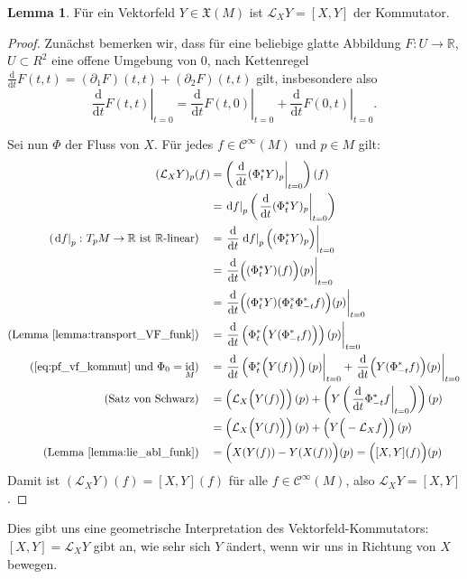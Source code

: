 \documentclass[a4paper]{scrreprt}
\numberwithin{equation}{chapter}
\newcommand{\D}{\mathrm{d}}
\DeclareMathOperator{\id}{id}
\newcommand{\sC}{\mathcal{C}^{\infty}}
\theoremstyle{definition}
\newtheorem{lemma}[defn]{Lemma}
\begin{document}
\begin{lemma}
	Für ein Vektorfeld $Y \in \mathfrak X(M)$ ist $\mathcal L_X Y = [X,Y]$ der Kommutator.

	\begin{proof}
		Zunächst bemerken wir, dass für eine beliebige glatte Abbildung $F \colon U \to \mathbb R$, $U \subset R^2$ eine offene Umgebung von 0, nach Kettenregel $\frac{\D}{\D t} F(t,t) = (\partial_1 F)(t,t) + (\partial_2 F)(t,t)$ gilt, insbesondere also
		\begin{equation} \label{eq:pf_vf_kommut} \tag{$*$}
			\left.\frac{\D}{\D t} F(t,t)\right|_{t=0} = \left.\frac{\D}{\D t} F(t,0)\right|_{t=0} + \left.\frac{\D}{\D t} F(0,t)\right|_{t=0}.
		\end{equation}

		Sei nun $\Phi$ der Fluss von $X$. Für jedes $f\in \sC(M)$ und $p\in M$ gilt:
		\begingroup
		\allowdisplaybreaks
		\begin{align*}
			(\mathcal L_X Y)_p(f) &= \left(\left.\frac{\D}{\D t}(\Phi_t^* Y)_p\right|_{t=0}\right)(f)\\
			&= \left.\D f\right|_p \left(\left.\frac{\D}{\D t}(\Phi_t^* Y)_p\right|_{t=0}\right)\\
			\text{($\left.\D f\right|_p\colon T_pM \to \mathbb R$ ist $\mathbb R$-linear)} \quad &= \left.\frac{\D}{\D t}\left.\D f\right|_p \Big((\Phi_t^* Y)_p\Big)\right|_{t=0}\\
			&= \left.\frac{\D}{\D t} \Big((\Phi_t^* Y) (f)\Big)(p)\right|_{t=0}\\
			&= \left.\frac{\D}{\D t}\Big((\Phi_t^* Y)(\Phi_t^* \Phi_{-t}^*f)\Big)(p)\right|_{t=0}\\
			\text{(Lemma \ref{lemma:transport_VF_funk})} \quad &= \left.\frac{\D}{\D t} \left(\Phi_t^* \Big(Y(\Phi_{-t}^*f)\Big)\right)(p) \right|_{t=0}\\
			\text{(\eqref{eq:pf_vf_kommut} und $\Phi_0 = \id_M$)} \quad &= \left.\frac{\D}{\D t}\left(\Phi_t^* \Big(Y(f)\Big)\right) (p) \right|_{t=0} + \left.\frac{\D}{\D t} \Big(Y(\Phi_{-t}^*f)\Big) (p) \right|_{t=0}\\
			\text{(Satz von Schwarz)} \quad &= \left(\mathcal L_X \Big(Y(f)\Big)\right)(p) + \left(Y\left( \left.\frac{\D}{\D t} \Phi_{-t}^*f \right|_{t=0} \right)\right)(p)\\
			&= \left(\mathcal L_X \Big(Y(f)\Big)\right)(p) + \left(Y\Big( - \mathcal L_X f \Big)\right)(p)\\
			\text{(Lemma \ref{lemma:lie_abl_funk})} \quad &= \Big(X(Y(f)) - Y(X(f))\Big)(p) = \Big([X,Y](f)\Big)(p)
		\end{align*}%
		\endgroup
		Damit ist $(\mathcal L_X Y)(f) = [X,Y](f)$ für alle $f\in\sC(M)$, also $\mathcal L_X Y = [X,Y]$.
	\end{proof}
\end{lemma}
Dies gibt uns eine geometrische Interpretation des Vektorfeld-Kommutators: $[X,Y] = \mathcal L_X Y$ gibt an, wie sehr sich $Y$ ändert, wenn wir uns in Richtung von $X$ bewegen.
\end{document}
